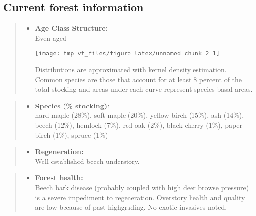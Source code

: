 \documentclass[]{tufte-handout}
\providecommand{\tightlist}{%
  \setlength{\itemsep}{0pt}\setlength{\parskip}{0pt}}
\begin{document}
\subsection{Current forest
information}\label{current-forest-information}

\begin{quote}
\begin{itemize}
\tightlist
\item
  \textbf{Age Class Structure:}\\
  \vspace{2pt} Even-aged\\

  \begin{marginfigure}
  \texttt{[image: fmp-vt\_files/figure-latex/unnamed-chunk-2-1]} \caption[Distributions are approximated with kernel density estimation]{Distributions are approximated with kernel density estimation. Common species are those that account for at least 8 percent of the total stocking and areas under each curve represent species basal areas.}\label{fig:unnamed-chunk-2}
  \end{marginfigure}
\end{itemize}
\end{quote}

\begin{quote}
\begin{itemize}
\tightlist
\item
  \textbf{Species (\% stocking):}\\
  \vspace{2pt} hard maple (28\%), soft maple (20\%), yellow birch
  (15\%), ash (14\%), beech (12\%), hemlock (7\%), red oak (2\%), black
  cherry (1\%), paper birch (1\%), spruce (1\%)
\end{itemize}
\end{quote}

\begin{quote}
\begin{itemize}
\tightlist
\item
  \textbf{Regeneration:}\\
  \vspace{2pt} Well established beech understory.
\end{itemize}
\end{quote}

\begin{quote}
\begin{itemize}
\tightlist
\item
  \textbf{Forest health:}\\
  \vspace{2pt} Beech bark disease (probably coupled with high deer
  browse pressure) is a severe impediment to regeneration. Overstory
  health and quality are low because of past highgrading. No exotic
  invasives noted.
\end{itemize}
\end{quote}
\end{document}

